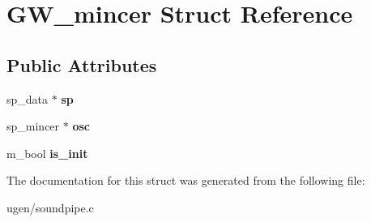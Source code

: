 \hypertarget{structGW__mincer}{}\section{G\+W\+\_\+mincer Struct Reference}
\label{structGW__mincer}
\subsection*{Public Attributes}
\begin{DoxyCompactItemize}
\item 
\hypertarget{structGW__mincer_a43550874f4c0b052c4d81efd604b70b6}{}\label{structGW__mincer_a43550874f4c0b052c4d81efd604b70b6} 
sp\+\_\+data $\ast$ {\bfseries sp}
\item 
\hypertarget{structGW__mincer_a4b8565727ae342011c5ed8c4fd19b241}{}\label{structGW__mincer_a4b8565727ae342011c5ed8c4fd19b241} 
sp\+\_\+mincer $\ast$ {\bfseries osc}
\item 
\hypertarget{structGW__mincer_a1fc21f635948ceff553f15329ad28b5c}{}\label{structGW__mincer_a1fc21f635948ceff553f15329ad28b5c} 
m\+\_\+bool {\bfseries is\+\_\+init}
\end{DoxyCompactItemize}


The documentation for this struct was generated from the following file\+:\begin{DoxyCompactItemize}
\item 
ugen/soundpipe.\+c\end{DoxyCompactItemize}

